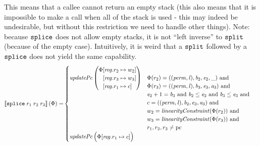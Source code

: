 \documentclass[a4paper]{article}
\begin{document}
This means that a callee cannot return an empty stack (this also means that it is impossible to make a call when all of the stack is used - this may indeed be undesirable, but without this restriction we need to handle other things).
Note: because $\tsplice{}{}{}$ does not allow empty stacks, it is not ``left inverse'' to $\tsplit{}{}{}{}$ (because of the empty case).
Intuitively, it is weird that a $\tsplit{}{}{}{}$ followed by a $\tsplice{}{}{}$ does not yield the same capability.
\begin{align*}
  \sem{\tsplice{r_1}{r_2}{r_3}}(\Phi) = &
                              \begin{cases}
                                \updPcAddr{}\left(
                                \arraycolsep=0pt
                                \begin{array}{r l}
                                  \Phi&\updReg{r_2}{w_2}\\
                                      &\updReg{r_3}{w_3}\\
                                      &\updReg{r_1}{c}
                                \end{array}\right)
&
                                \arraycolsep=0pt
                                \begin{array}[t]{l}
                                  \Phi(r_2) = ((\perm,\lin),\baddr_2,\eaddr_2,\_) \tand \\
                                  \Phi(r_3) = ((\perm,\lin),\baddr_3,\eaddr_3,\aaddr_3) \tand \\
                                  \eaddr_2 + 1 = \baddr_3 \tand \baddr_2 \leq \eaddr_2 \tand \baddr_3 \leq \eaddr_3 \tand \\
                                  c = ((\perm,\lin),\baddr_2,\eaddr_3,\aaddr_3) \tand\\
                                  w_2 = \linCons{\Phi(r_2)} \tand \\
                                  w_3 = \linCons{\Phi(r_3)}  \tand \\
                                  r_1,r_2,r_3 \neq \pcreg\\
                                \end{array}\\
                                \updPcAddr{}\left(
                                \arraycolsep=0pt
                                \begin{array}{r l}
                                  \Phi&\updReg{r_1}{c}
                                \end{array}\right)

\end{cases}
\end{align*}
\end{document}
